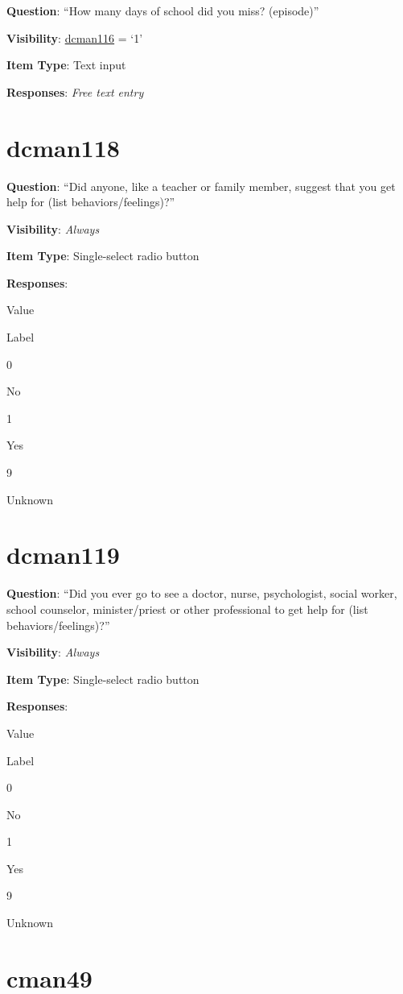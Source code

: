 \documentclass[]{book}
\begin{document}
\textbf{Question}: ``How many days of school did you miss? (episode)''

\textbf{Visibility}: \protect\hyperlink{dcman116}{dcman116} = `1'

\textbf{Item Type}: Text input

\textbf{Responses}: \emph{Free text entry}

\hypertarget{dcman118}{%
\section{dcman118}\label{dcman118}}

\textbf{Question}: ``Did anyone, like a teacher or family member, suggest that you get help for (list behaviors/feelings)?''

\textbf{Visibility}: \emph{Always}

\textbf{Item Type}: Single-select radio button

\textbf{Responses}:

Value

Label

0

No

1

Yes

9

Unknown

\hypertarget{dcman119}{%
\section{dcman119}\label{dcman119}}

\textbf{Question}: ``Did you ever go to see a doctor, nurse, psychologist, social worker, school counselor, minister/priest or other professional to get help for (list behaviors/feelings)?''

\textbf{Visibility}: \emph{Always}

\textbf{Item Type}: Single-select radio button

\textbf{Responses}:

Value

Label

0

No

1

Yes

9

Unknown

\hypertarget{cman49}{%
\section{cman49}\label{cman49}}
\end{document}
